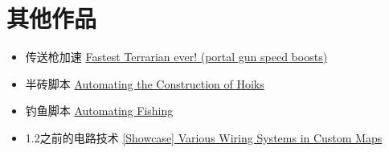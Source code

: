 \section{其他作品}
\begin{itemize}
\item 传送枪加速 \href{https://forums.terraria.org/index.php?threads/fastest-terrarian-ever-portal-gun-speed-boosts.76857/}{Fastest Terrarian ever! (portal gun speed boosts)}
\item 半砖脚本 \href{https://forums.terraria.org/index.php?threads/automating-the-construction-of-hoiks.76895/}{Automating the Construction of Hoiks}
\item 钓鱼脚本 \href{https://forums.terraria.org/index.php?threads/automating-fishing.76923/}{Automating Fishing}
\item 1.2之前的电路技术 \href{https://forums.terraria.org/index.php?threads/showcase-various-wiring-systems-in-custom-maps.77073/}{[Showcase] Various Wiring Systems in Custom Maps}
\end{itemize}

